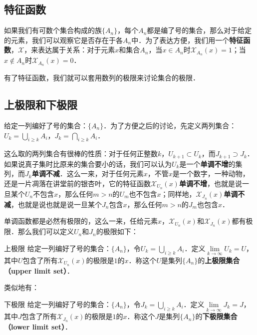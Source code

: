 
\subsection{特征函数}
如果我们有可数个集合构成的族$\{A_n\}$，每个$A_n$都是编了号的集合，那么对于给定的元素，我们可以观察它是否存在于各$A_n$中．为了表达方便，我们用一个\textbf{特征函数}，$\mathcal{X}$，来表达属于关系：对于元素$x$和集合$A_n$，当$x\in A_n$时$\mathcal{X}_{A_n}(x)=1$；当$x\not\in A_n$时$\mathcal{X}_{A_n}(x)=0$．

有了特征函数，我们就可以套用数列的极限来讨论集合的极限．

\subsection{上极限和下极限}
给定一列编好了号的集合：$\{A_n\}$．为了方便之后的讨论，先定义两列集合：$U_k=\bigcup_{i\ge k}A_i$，$J_k=\bigcap_{i\ge k}A_i$．

这么取的两列集合有很棒的性质：对于任何正整数$k$，$U_{k+1}\subset U_k$，而$J_{k+1}\supset J_k$．如果说真子集时比原来的集合要小的话，我们可以认为$U_k$是一个\textbf{单调不增}的集列，而$J_k$\textbf{单调不减}．这么一来，对于任何元素$x$，不管$x$是一个数字，一种动物，还是一片凋落在讲堂前的银杏叶，它的特征函数$\mathcal{X}_{U_n}(x)$\textbf{单调不增}，也就是说一旦某个$U_n$不包含$x$，那么任何$m>n$的$U_m$也不包含$x$；同样地，$\mathcal{X}_{J_n}(x)$\textbf{单调不减}，也就是说也就是说一旦某个$J_n$包含$x$，那么任何$m>n$的$J_m$也包含$x$．

单调函数都是必然有极限的，这么一来，任给元素$x$，$\mathcal{X}_{U_n}(x)$和$\mathcal{X}_{J_n}(x)$都有极限．那么我们可以定义$U_n$和$J_n$的极限如下：

\begin{definition}{上极限}
给定一列编好了号的集合：$\{A_n\}$，令$U_k=\bigcup_{i\ge k}A_i$．定义$\lim\limits_{k\rightarrow\infty} U_k=U$，其中$U$包含了所有$\mathcal{X}_{U_n}(x)$的极限是$1$的$x$．称这个$U$是集列$\{A_n\}$的\textbf{上极限集合（upper limit set）}．
\end{definition}

类似地有：

\begin{definition}{下极限}
给定一列编好了号的集合：$\{A_n\}$，令$J_k=\bigcup_{i\ge k}A_i$．定义$\lim\limits_{k\rightarrow\infty} J_k=J$，其中$J$包含了所有$\mathcal{X}_{J_n}(x)$的极限是$1$的$x$．称这个$J$是集列$\{A_n\}$的\textbf{下极限集合（lower limit set）}．
\end{definition}

